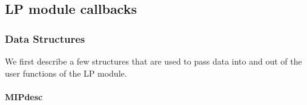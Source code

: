 \subsection{LP module callbacks}
\label{user-written-lp}

\subsubsection{Data Structures}
\label{data_structures}

We first describe a few structures that are used to pass
data into and out of the user functions of the LP module.

\begin{description}

\begin{htmlonly}
\paragraph{MIPdesc}
\end{htmlonly}
\label{MIPdesc}


\end{description}
